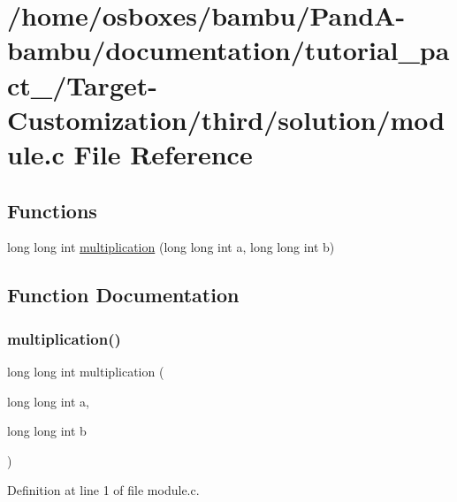 \hypertarget{tutorial__pact__2019_2Target-Customization_2third_2solution_2module_8c}{}\section{/home/osboxes/bambu/\+Pand\+A-\/bambu/documentation/tutorial\+\_\+pact\+\_/\+Target-\/\+Customization/third/solution/module.c File Reference}
\label{tutorial__pact__2019_2Target-Customization_2third_2solution_2module_8c}
\subsection*{Functions}
\begin{DoxyCompactItemize}
\item 
long long int \hyperlink{tutorial__pact__2019_2Target-Customization_2third_2solution_2module_8c_af7a373e176b9b2c01ac378680636fbe2}{multiplication} (long long int a, long long int b)
\end{DoxyCompactItemize}


\subsection{Function Documentation}
\mbox{\label{tutorial__pact__2019_2Target-Customization_2third_2solution_2module_8c_af7a373e176b9b2c01ac378680636fbe2}} 
\subsubsection{\texorpdfstring{multiplication()}{multiplication()}}
{\footnotesize\ttfamily long long int multiplication (\begin{DoxyParamCaption}\item[{long long int}]{a,  }\item[{long long int}]{b }\end{DoxyParamCaption})}



Definition at line 1 of file module.\+c.

